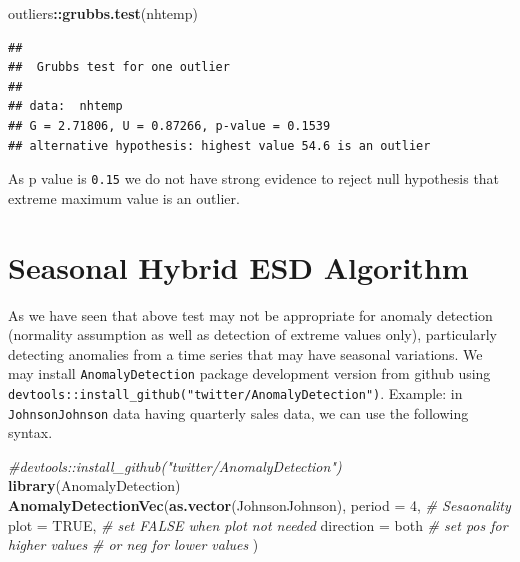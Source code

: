 \documentclass[
]{book}
\newenvironment{Shaded}{\begin{snugshade}}{\end{snugshade}}
\newcommand{\AttributeTok}[1]{\textcolor[rgb]{0.13,0.29,0.53}{#1}}
\newcommand{\CommentTok}[1]{\textcolor[rgb]{0.56,0.35,0.01}{\textit{#1}}}
\newcommand{\ConstantTok}[1]{\textcolor[rgb]{0.56,0.35,0.01}{#1}}
\newcommand{\DecValTok}[1]{\textcolor[rgb]{0.00,0.00,0.81}{#1}}
\newcommand{\FunctionTok}[1]{\textcolor[rgb]{0.13,0.29,0.53}{\textbf{#1}}}
\newcommand{\NormalTok}[1]{#1}
\newcommand{\SpecialCharTok}[1]{\textcolor[rgb]{0.81,0.36,0.00}{\textbf{#1}}}
\newcommand{\StringTok}[1]{\textcolor[rgb]{0.31,0.60,0.02}{#1}}
\begin{document}
\begin{Shaded}
\begin{Highlighting}[]
\NormalTok{outliers}\SpecialCharTok{::}\FunctionTok{grubbs.test}\NormalTok{(nhtemp)}
\end{Highlighting}
\end{Shaded}

\begin{verbatim}
## 
##  Grubbs test for one outlier
## 
## data:  nhtemp
## G = 2.71806, U = 0.87266, p-value = 0.1539
## alternative hypothesis: highest value 54.6 is an outlier
\end{verbatim}

As p value is \texttt{0.15} we do not have strong evidence to reject null hypothesis that extreme maximum value is an outlier.

\hypertarget{seasonal-hybrid-esd-algorithm}{%
\section{Seasonal Hybrid ESD Algorithm}\label{seasonal-hybrid-esd-algorithm}}

As we have seen that above test may not be appropriate for anomaly detection (normality assumption as well as detection of extreme values only), particularly detecting anomalies from a time series that may have seasonal variations. We may install \texttt{AnomalyDetection} package development version from github using \texttt{devtools::install\_github("twitter/AnomalyDetection")}. Example: in \texttt{JohnsonJohnson} data having quarterly sales data, we can use the following syntax.

\begin{Shaded}
\begin{Highlighting}[]
\CommentTok{\#devtools::install\_github("twitter/AnomalyDetection")}
\FunctionTok{library}\NormalTok{(AnomalyDetection)}
\FunctionTok{AnomalyDetectionVec}\NormalTok{(}\FunctionTok{as.vector}\NormalTok{(JohnsonJohnson), }
                    \AttributeTok{period =} \DecValTok{4}\NormalTok{, }\CommentTok{\# Sesaonality}
                    \AttributeTok{plot =} \ConstantTok{TRUE}\NormalTok{, }\CommentTok{\# set FALSE when plot not needed}
                    \AttributeTok{direction =} \StringTok{\textquotesingle{}both\textquotesingle{}} \CommentTok{\# set \textquotesingle{}pos\textquotesingle{} for higher values}
                                       \CommentTok{\# or \textquotesingle{}neg\textquotesingle{} for lower values}
\NormalTok{                    )}
\end{Highlighting}
\end{Shaded}
\end{document}
